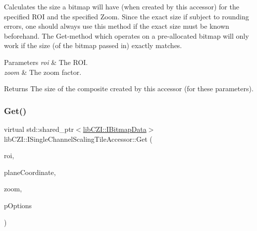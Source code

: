 Calculates the size a bitmap will have (when created by this accessor) for the specified R\+OI and the specified Zoom. Since the exact size if subject to rounding errors, one should always use this method if the exact size must be known beforehand. The Get-\/method which operates on a pre-\/allocated bitmap will only work if the size (of the bitmap passed in) exactly matches. 
\begin{DoxyParams}{Parameters}
{\em roi} & The R\+OI. \\
\hline
{\em zoom} & The zoom factor. \\
\hline
\end{DoxyParams}
\begin{DoxyReturn}{Returns}
The size of the composite created by this accessor (for these parameters). 
\end{DoxyReturn}
\mbox{\label{classlib_c_z_i_1_1_i_single_channel_scaling_tile_accessor_a3cd342d241a2c438a0b71d1342428a58}} 
\subsubsection{\texorpdfstring{Get()}{Get()}\hspace{0.1cm}{\footnotesize\ttfamily [1/3]}}
{\footnotesize\ttfamily virtual std\+::shared\+\_\+ptr$<$\hyperlink{classlib_c_z_i_1_1_i_bitmap_data}{lib\+C\+Z\+I\+::\+I\+Bitmap\+Data}$>$ lib\+C\+Z\+I\+::\+I\+Single\+Channel\+Scaling\+Tile\+Accessor\+::\+Get (\begin{DoxyParamCaption}\item[{const \hyperlink{structlib_c_z_i_1_1_int_rect}{lib\+C\+Z\+I\+::\+Int\+Rect} \&}]{roi,  }\item[{const \hyperlink{classlib_c_z_i_1_1_i_dim_coordinate}{lib\+C\+Z\+I\+::\+I\+Dim\+Coordinate} $\ast$}]{plane\+Coordinate,  }\item[{float}]{zoom,  }\item[{const \hyperlink{structlib_c_z_i_1_1_i_single_channel_scaling_tile_accessor_1_1_options}{lib\+C\+Z\+I\+::\+I\+Single\+Channel\+Scaling\+Tile\+Accessor\+::\+Options} $\ast$}]{p\+Options }\end{DoxyParamCaption})\hspace{0.3cm}{\ttfamily [pure virtual]}}

